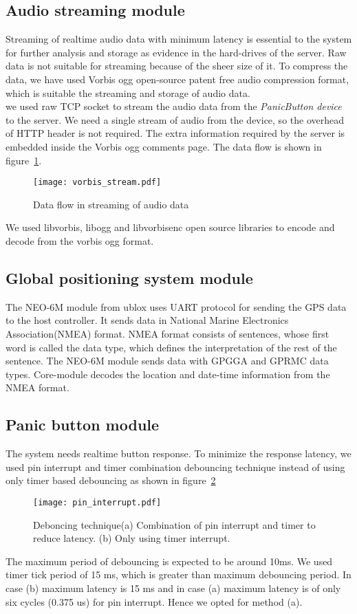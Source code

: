 \subsection{Audio streaming module}
Streaming of realtime audio data with minimum latency is essential to the system for further analysis and storage as evidence in the hard-drives of the server.
Raw data is not suitable for streaming because of the sheer size of it. To compress the data, we have used Vorbis ogg\cite{vorbis_site} open-source patent free audio compression format, which is suitable the streaming and storage of audio data.\\
we used raw TCP socket to stream the audio data from the \emph{PanicButton device} to the server. We need a single stream of audio from the device, so the overhead of HTTP header is not required. The extra information required by the server is embedded inside the Vorbis ogg comments page. The data flow is shown in figure~\ref{fig:vorbis_stream}.
\begin{figure}[H]
\centering
\texttt{[image: vorbis\_stream.pdf]}
\caption{Data flow in streaming of audio data}
\label{fig:vorbis_stream}
\end{figure}
We used libvorbis, libogg and libvorbisenc open source libraries to encode and decode from the vorbis ogg format.

\subsection{Global positioning system module}
The NEO-6M module from ublox uses UART protocol for sending the GPS data to the host controller. It sends data in National Marine Electronics Association(NMEA) format. NMEA format consists of sentences, whose first word is called the data type, which defines the interpretation of the rest of the sentence. The NEO-6M module sends data with GPGGA and GPRMC data types. Core-module decodes the location and date-time information from the NMEA format.
\subsection{Panic button module}
The system needs realtime button response. To minimize the response latency, we used pin interrupt and timer combination  debouncing technique instead of using only timer based debouncing as shown in figure~\ref{fig:pin_interrupt}
\begin{figure}[H]
\centering
\texttt{[image: pin\_interrupt.pdf]}
\caption{Deboncing technique(a) Combination of pin interrupt and timer to reduce latency. (b) Only using timer interrupt.}
\label{fig:pin_interrupt}
\end{figure}
The maximum period of debouncing is expected to be around 10ms\cite{debounce_paper}. We used timer tick period of 15 ms, which is greater than maximum debouncing period. In case (b) maximum latency is 15 ms and in case (a) maximum latency is of  only six cycles (0.375 us) for pin interrupt. Hence we opted for method (a).

